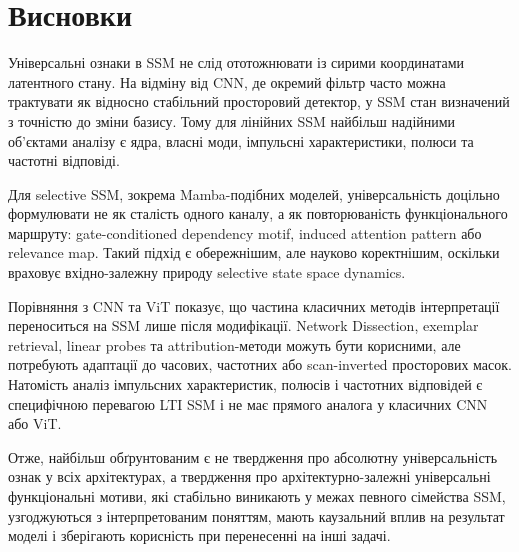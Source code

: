\documentclass[12pt,a4paper]{article}
\begin{document}
\section*{Висновки}

Універсальні ознаки в SSM не слід ототожнювати із сирими координатами
латентного стану. На відміну від CNN, де окремий фільтр часто можна
трактувати як відносно стабільний просторовий детектор, у SSM стан
визначений з точністю до зміни базису. Тому для лінійних SSM найбільш
надійними об'єктами аналізу є ядра, власні моди, імпульсні
характеристики, полюси та частотні відповіді.

Для selective SSM, зокрема Mamba-подібних моделей, універсальність
доцільно формулювати не як сталість одного каналу, а як повторюваність
функціонального маршруту: gate-conditioned dependency motif, induced
attention pattern або relevance map. Такий підхід є обережнішим, але
науково коректнішим, оскільки враховує вхідно-залежну природу
selective state space dynamics.

Порівняння з CNN та ViT показує, що частина класичних методів
інтерпретації переноситься на SSM лише після модифікації. Network
Dissection, exemplar retrieval, linear probes та attribution-методи
можуть бути корисними, але потребують адаптації до часових,
частотних або scan-inverted просторових масок. Натомість аналіз
імпульсних характеристик, полюсів і частотних відповідей є специфічною
перевагою LTI SSM і не має прямого аналога у класичних CNN або ViT.

Отже, найбільш обґрунтованим є не твердження про абсолютну
універсальність ознак у всіх архітектурах, а твердження про
архітектурно-залежні універсальні функціональні мотиви, які
стабільно виникають у межах певного сімейства SSM, узгоджуються з
інтерпретованим поняттям, мають каузальний вплив на результат моделі
і зберігають корисність при перенесенні на інші задачі.
\end{document}
